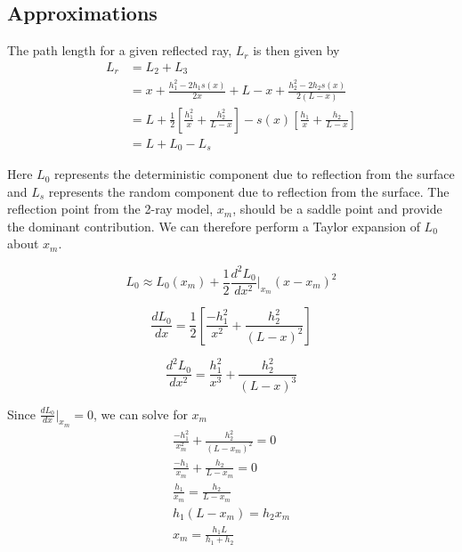 \subsection{Approximations}
The path length for a given reflected ray, $L_r$ is then given by
\begin{equation}
\begin{aligned}
L_r &= L_2 + L_3 \\
& = x + \frac{h_1^2-2h_1s(x)}{2x} +  L-x + \frac{h_2^2 - 2h_2s(x)}{2\left(L-x\right)} \\
& = L + \frac{1}{2}\left[\frac{h_1^2}{x} + \frac{h_2^2}{L-x} \right] - s(x)\left[ \frac{h_1}{x} + \frac{h_2}{L-x}\right] \\
&= L + L_0 - L_s
\end{aligned}
\label{mp_eq:13}
\end{equation}
\renewcommand{\baselinestretch}{2} \small\normalsize

Here $L_0$ represents the deterministic component due to reflection from the surface and $L_s$ represents the random component due to reflection from the surface. The reflection point from the 2-ray model, $x_m$, should be a saddle point and provide the dominant contribution. We can therefore perform a Taylor expansion of $L_0$ about $x_m$.

\begin{equation}
L_0 \approx L_0(x_m) + \frac{1}{2}\frac{d^2L_0}{dx^2}\bigg|_{x_m}(x-x_m)^2
\label{mp_eq:14}
\end{equation}

\begin{equation}
\frac{dL_0}{dx} = \frac{1}{2}\left[\frac{-h_1^2}{x^2} + \frac{h_2^2}{(L-x)^2} \right]
\label{mp_eq:15}
\end{equation}

\begin{equation}
\frac{d^2L_0}{dx^2} = \frac{h_1^2}{x^3} + \frac{h_2^2}{(L-x)^3} 
\label{mp_eq:16}
\end{equation}

Since $\frac{dL_0}{dx}\big|_{x_m} = 0$, we can solve for $x_m$
\begin{equation}
\begin{gathered}
\frac{-h_1^2}{x_m^2} + \frac{h_2^2}{(L-x_m)^2} = 0\\
\frac{-h_1}{x_m} + \frac{h_2}{L-x_m} = 0\\
\frac{h_1}{x_m} = \frac{h_2}{L-x_m}\\
h_1(L-x_m) = h_2x_m\\
x_m = \frac{h_1L}{h_1+h_2}
\end{gathered}
\label{mp_eq:17}
\end{equation}

